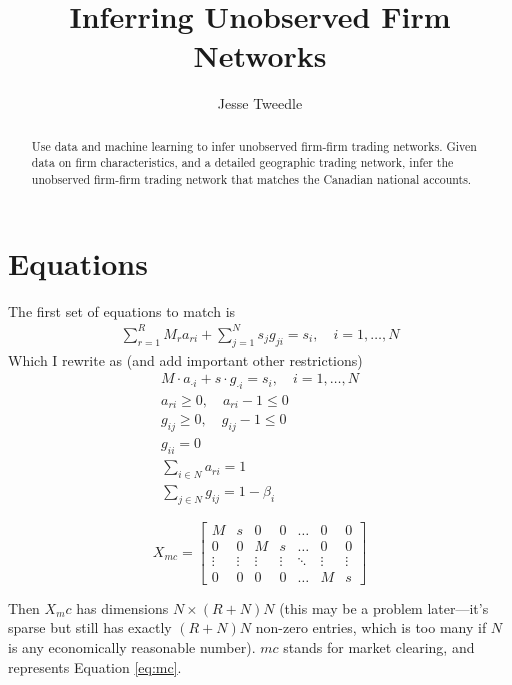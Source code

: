 \documentclass[11pt]{article}
\begin{document}
\title{Inferring Unobserved Firm Networks}
\author{Jesse Tweedle}
\date{}


 \maketitle

\begin{abstract}

Use data and machine learning to infer unobserved firm-firm trading networks. Given data on firm characteristics, and a detailed geographic trading network, infer the unobserved firm-firm trading network that matches the Canadian national accounts.

\end{abstract}

\section{Equations}

The first set of equations to match is 
\begin{gather}
\sum_{r=1}^R M_r a_{ri} + \sum_{j=1}^N s_j g_{ji} = s_i , \quad i = 1,\ldots, N
\end{gather}
Which I rewrite as (and add important other restrictions)
\begin{gather}
\label{eq:mc}
M \cdot a_{\cdot i} + s \cdot g_{\cdot i} = s_i, \quad i = 1,\ldots, N \\
a_{ri} \geq 0, \quad a_{ri} - 1 \leq 0 \\
g_{ij} \geq 0, \quad g_{ij} - 1\leq 0 \\
g_{ii} = 0 \\
\sum_{i \in N} a_{ri} = 1 \label{eq:rowsuma}\\
\sum_{j \in N} g_{ij} = 1-\beta_i\label{eq:rowsumg}
\end{gather}

\[
X_{mc} = 
\begin{bmatrix}
    M & s &  0 & 0 & \dots  & 0 & 0\\
    0 & 0 & M & s &\dots  & 0 & 0 \\
    \vdots & \vdots & \vdots & \vdots & \ddots & \vdots & \vdots  \\
    0 & 0 & 0 & 0 & \dots  & M & s
\end{bmatrix}
\]

Then $X_mc$ has dimensions $N \times (R+N)N$ (this may be a problem later---it's sparse but still has exactly $(R+N)N$ non-zero entries, which is too many if $N$ is any economically reasonable number). $mc$ stands for market clearing, and represents Equation \eqref{eq:mc}.
\end{document}
